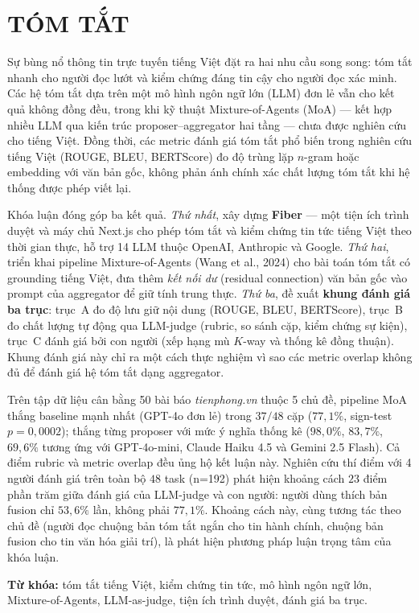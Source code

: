 \chapter*{TÓM TẮT}

Sự bùng nổ thông tin trực tuyến tiếng Việt đặt ra hai nhu cầu song song: tóm
tắt nhanh cho người đọc lướt và kiểm chứng đáng tin cậy cho người đọc xác minh.
Các hệ tóm tắt dựa trên một mô hình ngôn ngữ lớn (LLM) đơn lẻ vẫn cho kết quả
không đồng đều, trong khi kỹ thuật Mixture-of-Agents (MoA) --- kết hợp nhiều
LLM qua kiến trúc proposer--aggregator hai tầng --- chưa được nghiên cứu cho
tiếng Việt. Đồng thời, các metric đánh giá tóm tắt phổ biến trong nghiên cứu
tiếng Việt (ROUGE, BLEU, BERTScore) đo độ trùng lặp $n$-gram hoặc embedding
với văn bản gốc, không phản ánh chính xác chất lượng tóm tắt khi hệ thống
được phép viết lại.

Khóa luận đóng góp ba kết quả. \textit{Thứ nhất}, xây dựng \textbf{Fiber} ---
một tiện ích trình duyệt và máy chủ Next.js cho phép tóm tắt và kiểm chứng
tin tức tiếng Việt theo thời gian thực, hỗ trợ 14 LLM thuộc OpenAI, Anthropic
và Google. \textit{Thứ hai}, triển khai pipeline Mixture-of-Agents (Wang et
al., 2024) cho bài toán tóm tắt có grounding tiếng Việt, đưa thêm
\textit{kết nối dư} (residual connection) văn bản gốc vào prompt của
aggregator để giữ tính trung thực. \textit{Thứ ba}, đề xuất \textbf{khung
đánh giá ba trục}: trục~A đo độ lưu giữ nội dung (ROUGE, BLEU, BERTScore),
trục~B đo chất lượng tự động qua LLM-judge (rubric, so sánh cặp, kiểm chứng
sự kiện), trục~C đánh giá bởi con người (xếp hạng mù $K$-way và thống kê
đồng thuận). Khung đánh giá này chỉ ra một cách thực nghiệm vì sao các metric
overlap không đủ để đánh giá hệ tóm tắt dạng aggregator.

Trên tập dữ liệu cân bằng 50 bài báo \textit{tienphong.vn} thuộc 5 chủ đề,
pipeline MoA thắng baseline mạnh nhất (GPT-4o đơn lẻ) trong $37/48$ cặp
($77{,}1\%$, sign-test $p = 0{,}0002$); thắng từng proposer với mức ý nghĩa
thống kê ($98{,}0\%$, $83{,}7\%$, $69{,}6\%$ tương ứng với GPT-4o-mini,
Claude Haiku 4.5 và Gemini 2.5 Flash). Cả điểm rubric và metric overlap đều
ủng hộ kết luận này. Nghiên cứu thí điểm với 4 người đánh giá trên toàn bộ
$48$ task (n=192) phát hiện khoảng cách $23$ điểm phần trăm giữa đánh giá
của LLM-judge và con người: người dùng thích bản fusion chỉ $53{,}6\%$ lần,
không phải $77{,}1\%$. Khoảng cách này, cùng tương tác theo chủ đề (người đọc
chuộng bản tóm tắt ngắn cho tin hành chính, chuộng bản fusion cho tin văn hóa
giải trí), là phát hiện phương pháp luận trọng tâm của khóa luận.

\vspace{0.4em}
\textbf{Từ khóa:} tóm tắt tiếng Việt, kiểm chứng tin tức, mô hình ngôn ngữ
lớn, Mixture-of-Agents, LLM-as-judge, tiện ích trình duyệt, đánh giá ba trục.
